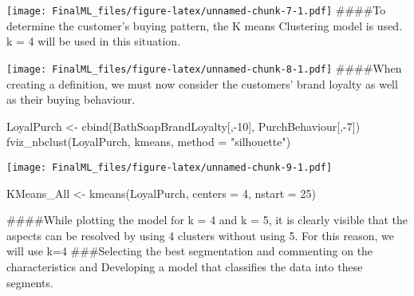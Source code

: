 \documentclass[
]{article}
\newenvironment{Shaded}{\begin{snugshade}}{\end{snugshade}}
\newcommand{\AttributeTok}[1]{\textcolor[rgb]{0.77,0.63,0.00}{#1}}
\newcommand{\CommentTok}[1]{\textcolor[rgb]{0.56,0.35,0.01}{\textit{#1}}}
\newcommand{\DecValTok}[1]{\textcolor[rgb]{0.00,0.00,0.81}{#1}}
\newcommand{\FunctionTok}[1]{\textcolor[rgb]{0.00,0.00,0.00}{#1}}
\newcommand{\NormalTok}[1]{#1}
\newcommand{\OtherTok}[1]{\textcolor[rgb]{0.56,0.35,0.01}{#1}}
\newcommand{\SpecialCharTok}[1]{\textcolor[rgb]{0.00,0.00,0.00}{#1}}
\newcommand{\StringTok}[1]{\textcolor[rgb]{0.31,0.60,0.02}{#1}}
\begin{document}
\texttt{[image: FinalML\_files/figure-latex/unnamed-chunk-7-1.pdf]}
\#\#\#\#To determine the customer's buying pattern, the K means
Clustering model is used. k = 4 will be used in this situation.

\begin{Shaded}
\end{Shaded}

\texttt{[image: FinalML\_files/figure-latex/unnamed-chunk-8-1.pdf]}
\#\#\#\#When creating a definition, we must now consider the customers'
brand loyalty as well as their buying behaviour.

\begin{Shaded}
\begin{Highlighting}[]
\NormalTok{LoyalPurch }\OtherTok{\textless{}{-}} \FunctionTok{cbind}\NormalTok{(BathSoapBrandLoyalty[,}\SpecialCharTok{{-}}\DecValTok{10}\NormalTok{], PurchBehaviour[,}\SpecialCharTok{{-}}\DecValTok{7}\NormalTok{])}
\FunctionTok{fviz\_nbclust}\NormalTok{(LoyalPurch, kmeans, }\AttributeTok{method =} \StringTok{"silhouette"}\NormalTok{)}
\end{Highlighting}
\end{Shaded}

\texttt{[image: FinalML\_files/figure-latex/unnamed-chunk-9-1.pdf]}

\begin{Shaded}
\begin{Highlighting}[]
\NormalTok{KMeans\_All }\OtherTok{\textless{}{-}} \FunctionTok{kmeans}\NormalTok{(LoyalPurch, }\AttributeTok{centers =} \DecValTok{4}\NormalTok{, }\AttributeTok{nstart =} \DecValTok{25}\NormalTok{)}
\end{Highlighting}
\end{Shaded}

\#\#\#\#While plotting the model for k = 4 and k = 5, it is clearly
visible that the aspects can be resolved by using 4 clusters without
using 5. For this reason, we will use k=4 \#\#\#Selecting the best
segmentation and commenting on the characteristics and Developing a
model that classifies the data into these segments.
\end{document}

